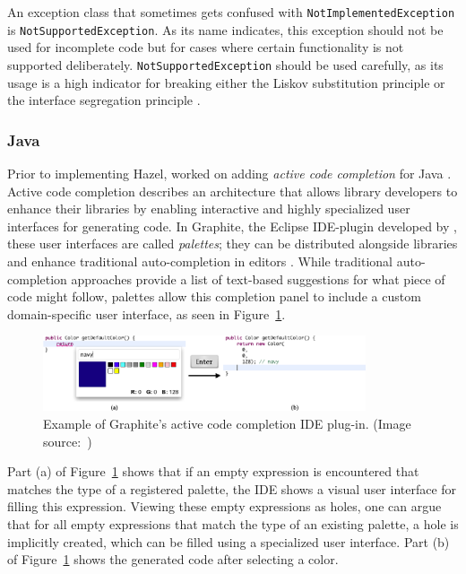 An exception class that sometimes gets confused with \texttt{NotImplementedException} is \texttt{NotSupportedException}.
As its name indicates, this exception should not be used for incomplete code but for cases where certain functionality is not supported deliberately.
\texttt{NotSupportedException} should be used carefully, as its usage is a high indicator for breaking either the Liskov substitution principle or the interface segregation principle \cite{patrik_liskov_2017}.


\subsubsection{Java}
Prior to implementing Hazel, \citeauthor{omar_active_2012} worked on adding \emph{active code completion} for Java \cite{omar_active_2012}.
Active code completion describes an architecture that allows library developers to enhance their libraries by enabling interactive and highly specialized user interfaces for generating code.
In Graphite, the Eclipse IDE-plugin developed by \citeauthor{omar_active_2012}, these user interfaces are called \emph{palettes}; they can be distributed alongside libraries and enhance traditional auto-completion in editors \cite{omar_active_2012}.
While traditional auto-completion approaches provide a list of text-based suggestions for what piece of code might follow, palettes allow this completion panel to include a custom domain-specific user interface, as seen in Figure~\ref{fig:graphite-active-code-completion}.

\begin{figure}[ht]
    \centering
    \includegraphics[width=0.85\textwidth]{images/active-code-completion}
    \caption{Example of Graphite's active code completion IDE plug-in. (Image source:~\cite{omar_active_2012})}
    \label{fig:graphite-active-code-completion}
\end{figure}

Part (a) of Figure~\ref{fig:graphite-active-code-completion} shows that if an empty expression is encountered that matches the type of a registered palette, the IDE shows a visual user interface for filling this expression.
Viewing these empty expressions as holes, one can argue that for all empty expressions that match the type of an existing palette, a hole is implicitly created, which can be filled using a specialized user interface.
Part (b) of Figure~\ref{fig:graphite-active-code-completion} shows the generated code after selecting a color.


